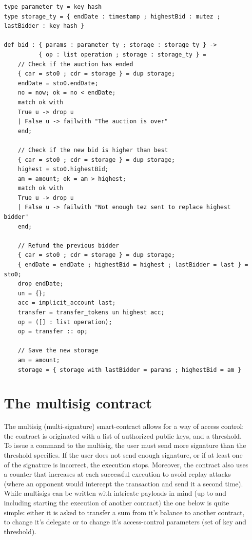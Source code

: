 \documentclass{report}
\begin{document}
\begin{lstlisting}
type parameter_ty = key_hash
type storage_ty = { endDate : timestamp ; highestBid : mutez ; lastBidder : key_hash }

def bid : { params : parameter_ty ; storage : storage_ty } ->
          { op : list operation ; storage : storage_ty } =
    // Check if the auction has ended
    { car = sto0 ; cdr = storage } = dup storage;
    endDate = sto0.endDate;
    no = now; ok = no < endDate;
    match ok with
    True u -> drop u
    | False u -> failwith "The auction is over"
    end;

    // Check if the new bid is higher than best
    { car = sto0 ; cdr = storage } = dup storage;
    highest = sto0.highestBid;
    am = amount; ok = am > highest;
    match ok with
    True u -> drop u
    | False u -> failwith "Not enough tez sent to replace highest bidder"
    end;

    // Refund the previous bidder
    { car = sto0 ; cdr = storage } = dup storage;
    { endDate = endDate ; highestBid = highest ; lastBidder = last } = sto0;
    drop endDate;
    un = {};
    acc = implicit_account last;
    transfer = transfer_tokens un highest acc;
    op = ([] : list operation);
    op = transfer :: op;

    // Save the new storage
    am = amount;
    storage = { storage with lastBidder = params ; highestBid = am }
\end{lstlisting}

\section{The multisig contract}
\label{appendix:multisigAlbert}

The multisig (multi-signature) smart-contract allows for a way of access control: the contract is originated with a list of authorized public keys, and a threshold. To issue a command to the multisig, the user must send more signature than the threshold specifies. If the user does not send enough signature, or if at least one of the signature is incorrect, the execution stops. Moreover, the contract also uses a counter that increases at each successful execution to avoid replay attacks (where an opponent would intercept the transaction and send it a second time). While multisigs can be written with intricate payloads in mind (up to and including starting the execution of another contract) the one below is quite simple: either it is asked to transfer a sum from it's balance to another contract, to change it's delegate or to change it's access-control parameters (set of key and threshold).
\end{document}
